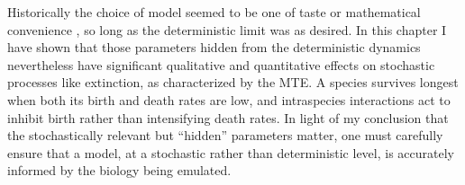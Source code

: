 Historically the choice of model seemed to be one of taste or mathematical convenience \cite{Greenhalgh1990,Ovaskainen2010,Assaf2010,Allen2003a,Norden1982,Newman2004,Allen2005,Nasell2001}, so long as the deterministic limit was as desired. %
In this chapter I have shown that those parameters hidden from the deterministic dynamics nevertheless have significant qualitative and quantitative effects on stochastic processes like extinction, as characterized by the MTE. 
A species survives longest when both its birth and death rates are low, and intraspecies interactions act to inhibit birth rather than intensifying death rates. 
In light of my conclusion that the stochastically relevant but ``hidden'' parameters matter, one must carefully ensure that a model, at a stochastic rather than deterministic level, is accurately informed by the biology being emulated. 

